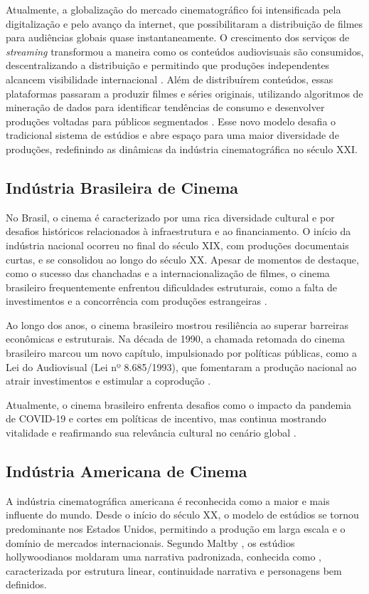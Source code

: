 Atualmente, a globalização do mercado cinematográfico foi intensificada pela digitalização e pelo avanço da internet, que possibilitaram a distribuição de filmes para audiências globais quase instantaneamente. O crescimento dos serviços de \textit{streaming} transformou a maneira como os conteúdos audiovisuais são consumidos, descentralizando a distribuição e permitindo que produções independentes alcancem visibilidade internacional \cite{sharma2020data}. Além de distribuírem conteúdos, essas plataformas passaram a produzir filmes e séries originais, utilizando algoritmos de mineração de dados para identificar tendências de consumo e desenvolver produções voltadas para públicos segmentados \cite{sharma2020data}. Esse novo modelo desafia o tradicional sistema de estúdios e abre espaço para uma maior diversidade de produções, redefinindo as dinâmicas da indústria cinematográfica no século XXI.


\subsection{Indústria Brasileira de Cinema}
    No Brasil, o cinema é caracterizado por uma rica diversidade cultural e por desafios históricos relacionados à infraestrutura e ao financiamento. O início da indústria nacional ocorreu no final do século XIX, com produções documentais curtas, e se consolidou ao longo do século XX. Apesar de momentos de destaque, como o sucesso das chanchadas e a internacionalização de filmes, o cinema brasileiro frequentemente enfrentou dificuldades estruturais, como a falta de investimentos e a concorrência com produções estrangeiras \cite{ramos1997historia}.
    
    Ao longo dos anos, o cinema brasileiro mostrou resiliência ao superar barreiras econômicas e estruturais. Na década de 1990, a chamada retomada do cinema brasileiro marcou um novo capítulo, impulsionado por políticas públicas, como a Lei do Audiovisual (Lei nº 8.685/1993), que fomentaram a produção nacional ao atrair investimentos e estimular a coprodução \cite{ramos1997historia}.
    
    Atualmente, o cinema brasileiro enfrenta desafios como o impacto da pandemia de COVID-19 e cortes em políticas de incentivo, mas continua mostrando vitalidade e reafirmando sua relevância cultural no cenário global \cite{rocha2023cinema}.

\subsection{Indústria Americana de Cinema}
A indústria cinematográfica americana é reconhecida como a maior e mais influente do mundo. Desde o início do século XX, o modelo de estúdios se tornou predominante nos Estados Unidos, permitindo a produção em larga escala e o domínio de mercados internacionais. Segundo Maltby \cite{maltby2003hollywood}, os estúdios hollywoodianos moldaram uma narrativa padronizada, conhecida como , caracterizada por estrutura linear, continuidade narrativa e personagens bem definidos.


